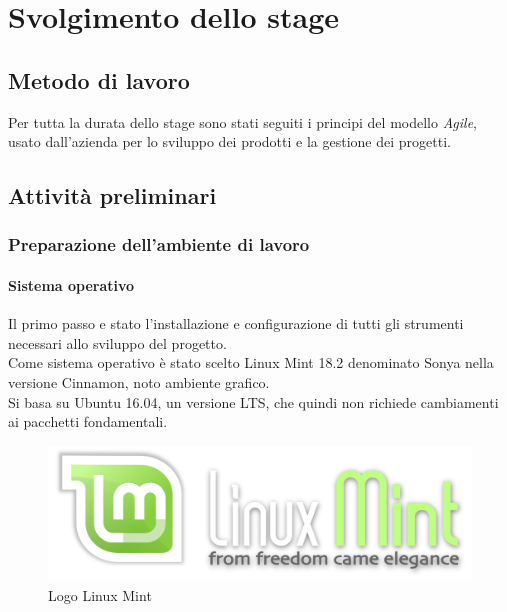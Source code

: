 \chapter{Svolgimento dello stage}
  \section{Metodo di lavoro}
    Per tutta la durata dello stage sono stati seguiti i principi del modello \textit{Agile}, usato dall'azienda per lo sviluppo dei prodotti e la gestione dei progetti.
  \section{Attività preliminari}
    \subsection{Preparazione dell'ambiente di lavoro}
      \subsubsection{Sistema operativo}
        Il primo passo e stato l'installazione e configurazione di tutti gli strumenti necessari allo sviluppo del progetto.\\
        Come sistema operativo è stato scelto Linux Mint 18.2 denominato Sonya nella versione Cinnamon, noto ambiente grafico.\\
        Si basa su Ubuntu 16.04, un versione LTS, che quindi non richiede cambiamenti ai pacchetti fondamentali.
        \begin{figure}[h]
          \centering
          \includegraphics[scale=0.1]{immagini/linuxmint.png}
          \caption{Logo Linux Mint}
          \label{logoMint}
        \end{figure}
